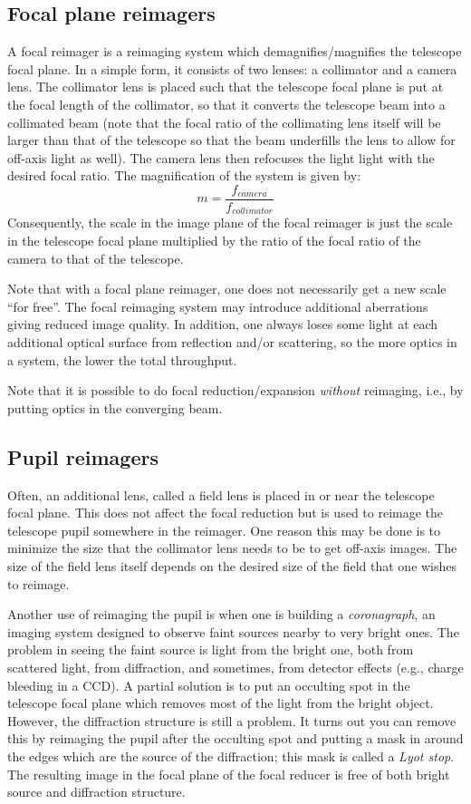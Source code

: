 \documentclass[12pt]{article}
\begin{document}
\subsection*{Focal plane reimagers}
A focal reimager is a reimaging system which demagnifies/magnifies the
telescope focal plane. In a simple form, it consists of two lenses: a
collimator and a camera lens. The collimator lens is placed such that
the telescope focal plane is put at the focal length of the
collimator, so that it converts the telescope beam into a collimated
beam (note that the focal ratio of the collimating lens itself will be
larger than that of the telescope so that the beam underfills the lens
to allow for off-axis light as well). The camera lens then refocuses
the light light with the desired focal ratio. The magnification of the
system is given by:
$$ m = \frac{f_{camera}}{f_{collimator}}  $$
Consequently, the scale in the image plane of the focal reimager is
just the scale in the telescope focal plane multiplied by the ratio of
the focal ratio of the camera to that of the telescope.

Note that with a focal plane reimager, one does not necessarily get a
new scale ``for free''. The focal reimaging system may introduce
additional aberrations giving reduced image quality. In addition, one
always loses some light at each additional optical surface from
reflection and/or scattering, so the more optics in a system, the
lower the total throughput.

Note that it is possible to do focal reduction/expansion
\emph{without} reimaging, i.e., by putting optics in the converging beam.

\subsection*{Pupil reimagers}
Often, an additional lens, called a field lens is placed in or near
the telescope focal plane. This does not affect the focal reduction
but is used to reimage the telescope pupil somewhere in the reimager.
One reason this may be done is to minimize the size that the
collimator lens needs to be to get off-axis images. The size of the
field lens itself depends on the desired size of the field that one
wishes to reimage.

Another use of reimaging the pupil is when one is building a
\emph{coronagraph}, an imaging system designed to observe faint sources
nearby to very bright ones. The problem in seeing the faint source is
light from the bright one, both from scattered light, from
diffraction, and sometimes, from detector effects (e.g., charge
bleeding in a CCD). A partial solution is to put an occulting spot in
the telescope focal plane which removes most of the light from the
bright object. However, the diffraction structure is still a problem.
It turns out you can remove this by reimaging the pupil after the
occulting spot and putting a mask in around the edges which are the
source of the diffraction; this mask is called a \emph{Lyot stop}.
The resulting image in the focal plane of the focal reducer is free of
both bright source and diffraction structure.
\end{document}
